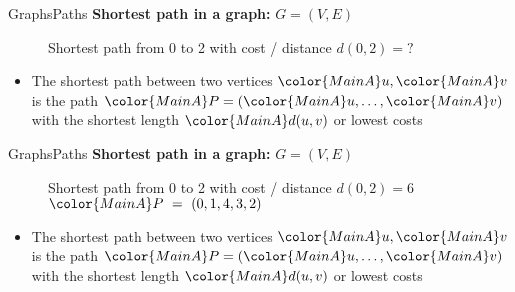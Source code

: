 \begin{frame}{Graphs}{Paths}
  \textbf{Shortest path in a graph:}
         {\color{MainA}$G = (V , E)$}
  \begin{figure}
    \begin{adjustbox}{width=0.75\linewidth}
      
    \end{adjustbox}
    \caption{{\color{MainA}Shortest path} from 0 to 2 with cost / distance
      {\color{MainA}$d(0,2) = ?$}%
     }
    \label{fig:graphs:shortest_path}
  \end{figure}
  \vspace{-1em}
  \begin{itemize}
    \item<3->
      The {\color{MainA}shortest path} between two vertices
      ${\color{MainA}u}, {\color{MainA}v}$ is the path
      \begin{math}
        {\color{MainA}P}
          = ({\color{MainA}u}, \dots, {\color{MainA}v})
      \end{math}
      with the shortest length ${\color{MainA}d(u,v)}$ or lowest costs
  \end{itemize}
\end{frame}

\begin{frame}{Graphs}{Paths}
  \textbf{Shortest path in a graph:}
         {\color{MainA}$G = (V , E)$}
  \begin{figure}
    \begin{adjustbox}{width=0.75\linewidth}
      
    \end{adjustbox}
    \caption{{\color{MainA}Shortest path} from 0 to 2 with cost / distance
      {\color{MainA}$d(0,2) = 6$}\\
      ${\color{MainA}P}~=~(0, 1, 4, 3, 2)$}
  \end{figure}
  \vspace{-1em}
  \begin{itemize}
    \item
      The {\color{MainA}shortest path} between two vertices
      ${\color{MainA}u}, {\color{MainA}v}$ is the path
      \begin{math}
        {\color{MainA}P}
          = ({\color{MainA}u}, \dots, {\color{MainA}v})
      \end{math}
      with the shortest length ${\color{MainA}d(u,v)}$ or lowest costs
  \end{itemize}
\end{frame}

